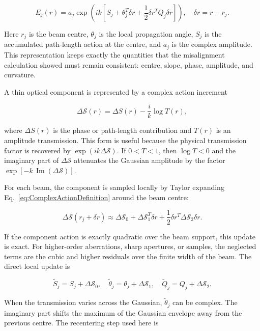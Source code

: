 \documentclass{article}
\begin{document}
\begin{equation}
E_j(r)=a_j\exp\left(ik\left[S_j+\theta_j^T\delta r+\frac{1}{2}\delta r^TQ_j\delta r\right]\right),
\quad \delta r=r-r_j .
\label{eq:GaussianStateLocalAction}
\end{equation}

Here $r_j$ is the beam centre, $\theta_j$ is the local propagation angle, $S_j$ is the accumulated path-length action at the centre, and $a_j$ is the complex amplitude. 
This representation keeps exactly the quantities that the misalignment calculation showed must remain consistent: centre, slope, phase, amplitude, and curvature.

A thin optical component is represented by a complex action increment

\begin{equation}
\Delta \mathcal{S}(r)=\Delta S(r)-\frac{i}{k}\log T(r),
\label{eq:ComplexActionDefinition}
\end{equation}

where $\Delta S(r)$ is the phase or path-length contribution and $T(r)$ is an amplitude transmission. 
This form is useful because the physical transmission factor is recovered by $\exp(ik\Delta\mathcal{S})$. 
If $0<T<1$, then $\log T<0$ and the imaginary part of $\Delta\mathcal{S}$ attenuates the Gaussian amplitude by the factor $\exp[-k\,\operatorname{Im}(\Delta\mathcal{S})]$.

For each beam, the component is sampled locally by Taylor expanding Eq.~\eqref{eq:ComplexActionDefinition} around the beam centre:

\begin{equation}
\Delta\mathcal{S}(r_j+\delta r)\approx
\Delta\mathcal{S}_0+\Delta\mathcal{S}_1^T\delta r+\frac{1}{2}\delta r^T\Delta\mathcal{S}_2\delta r .
\label{eq:ComplexActionTaylor}
\end{equation}

If the component action is exactly quadratic over the beam support, this update is exact. 
For higher-order aberrations, sharp apertures, or samples, the neglected terms are the cubic and higher residuals over the finite width of the beam. 
The direct local update is

\begin{equation}
\tilde{S}_j=S_j+\Delta\mathcal{S}_0,\quad
\tilde{\theta}_j=\theta_j+\Delta\mathcal{S}_1,\quad
\tilde{Q}_j=Q_j+\Delta\mathcal{S}_2 .
\label{eq:DirectComplexActionUpdate}
\end{equation}

When the transmission varies across the Gaussian, $\tilde{\theta}_j$ can be complex. 
The imaginary part shifts the maximum of the Gaussian envelope away from the previous centre. 
The recentering step used here is
\end{document}
